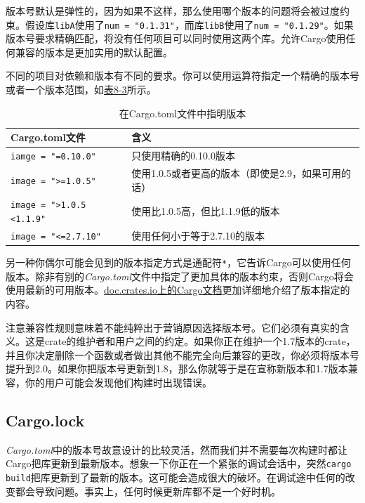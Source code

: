 版本号默认是弹性的，因为如果不这样，那么使用哪个版本的问题将会被过度约束。假设库\texttt{libA}使用了\texttt{num = "0.1.31"}，而库\texttt{libB}使用了\texttt{num = "0.1.29"}。如果版本号要求精确匹配，将没有任何项目可以同时使用这两个库。允许Cargo使用任何兼容的版本是更加实用的默认配置。

不同的项目对依赖和版本有不同的要求。你可以使用运算符指定一个精确的版本号或者一个版本范围，如\hyperref[t8-3]{表8-3}所示。

\begin{table}[htbp]
    \centering
    \caption{在Cargo.toml文件中指明版本}
    \label{t8-3}
    \begin{tabular}{p{}p{}}
        \hline
        \textbf{Cargo.toml文件} & \textbf{含义} \\
        \hline
        \texttt{iamge = "=0.10.0"}  & 只使用精确的0.10.0版本 \\
        \rowcolor{tablecolor}
        \texttt{image = ">=1.0.5"}  & 使用1.0.5或者更高的版本（即使是2.9，如果可用的话） \\
        \texttt{image = ">1.0.5 <1.1.9"} & 使用比1.0.5高，但比1.1.9低的版本 \\
        \rowcolor{tablecolor}
        \texttt{image = "<=2.7.10"} & 使用任何小于等于2.7.10的版本 \\
    \end{tabular}
\end{table}

另一种你偶尔可能会见到的版本指定方式是通配符\texttt{*}，它告诉Cargo可以使用任何版本。除非有别的\emph{Cargo.toml}文件中指定了更加具体的版本约束，否则Cargo将会使用最新的可用版本。\href{https://doc.rust-lang.org/cargo/reference/specifying-dependencies.html}{doc.crates.io上的Cargo文档}更加详细地介绍了版本指定的内容。

注意兼容性规则意味着不能纯粹出于营销原因选择版本号。它们必须有真实的含义。这是crate的维护者和用户之间的约定。如果你正在维护一个1.7版本的crate，并且你决定删除一个函数或者做出其他不能完全向后兼容的更改，你必须将版本号提升到2.0。如果你把版本号更新到1.8，那么你就等于是在宣称新版本和1.7版本兼容，你的用户可能会发现他们构建时出现错误。

\subsection{Cargo.lock}
\emph{Cargo.toml}中的版本号故意设计的比较灵活，然而我们并不需要每次构建时都让Cargo把库更新到最新版本。想象一下你正在一个紧张的调试会话中，突然\texttt{cargo build}把库更新到了最新的版本。这可能会造成很大的破坏。在调试途中任何的改变都会导致问题。事实上，任何时候更新库都不是一个好时机。

